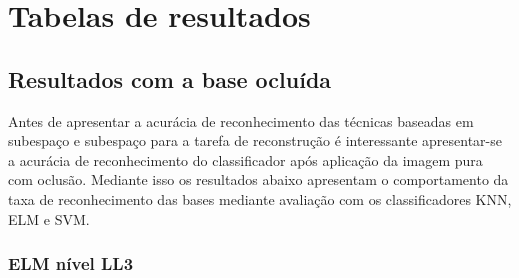\chapter{Tabelas de resultados}
\label{apen7:resultados}


\section{Resultados com a base ocluída}

Antes de apresentar a acurácia de reconhecimento das técnicas baseadas em subespaço e subespaço para a tarefa de reconstrução é interessante apresentar-se a acurácia de reconhecimento do classificador após aplicação da imagem pura com oclusão. Mediante isso os resultados abaixo apresentam o comportamento da taxa de reconhecimento das bases mediante avaliação com os classificadores KNN, ELM e SVM.


%





\subsection{ELM nível LL3}

